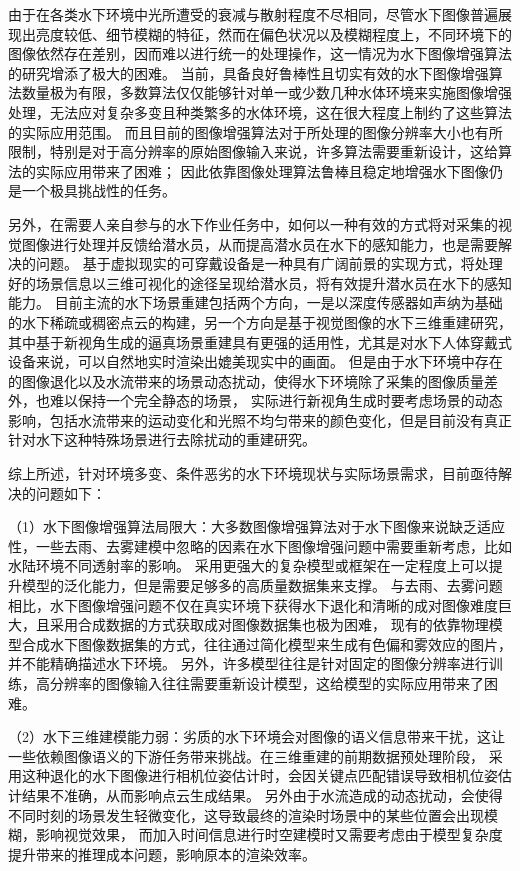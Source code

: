 由于在各类水下环境中光所遭受的衰减与散射程度不尽相同，尽管水下图像普遍展现出亮度较低、细节模糊的特征，然而在偏色状况以及模糊程度上，不同环境下的图像依然存在差别，因而难以进行统一的处理操作，这一情况为水下图像增强算法的研究增添了极大的困难。
当前，具备良好鲁棒性且切实有效的水下图像增强算法数量极为有限，多数算法仅仅能够针对单一或少数几种水体环境来实施图像增强处理，无法应对复杂多变且种类繁多的水体环境，这在很大程度上制约了这些算法的实际应用范围。
而且目前的图像增强算法对于所处理的图像分辨率大小也有所限制，特别是对于高分辨率的原始图像输入来说，许多算法需要重新设计，这给算法的实际应用带来了困难；
因此依靠图像处理算法鲁棒且稳定地增强水下图像仍是一个极具挑战性的任务。

另外，在需要人亲自参与的水下作业任务中，如何以一种有效的方式将对采集的视觉图像进行处理并反馈给潜水员，从而提高潜水员在水下的感知能力，也是需要解决的问题。\cite{underwater_perception}
基于虚拟现实的可穿戴设备是一种具有广阔前景的实现方式，将处理好的场景信息以三维可视化的途径呈现给潜水员，将有效提升潜水员在水下的感知能力。
目前主流的水下场景重建包括两个方向，一是以深度传感器如声纳为基础的水下稀疏或稠密点云的构建，另一个方向是基于视觉图像的水下三维重建研究，
其中基于新视角生成的逼真场景重建具有更强的适用性，尤其是对水下人体穿戴式设备来说，可以自然地实时渲染出媲美现实中的画面。
但是由于水下环境中存在的图像退化以及水流带来的场景动态扰动，使得水下环境除了采集的图像质量差外，也难以保持一个完全静态的场景，
实际进行新视角生成时要考虑场景的动态影响，包括水流带来的运动变化和光照不均匀带来的颜色变化，但是目前没有真正针对水下这种特殊场景进行去除扰动的重建研究。

综上所述，针对环境多变、条件恶劣的水下环境现状与实际场景需求，目前亟待解决的问题如下：

（1）水下图像增强算法局限大：大多数图像增强算法对于水下图像来说缺乏适应性，一些去雨、去雾建模中忽略的因素在水下图像增强问题中需要重新考虑，比如水陆环境不同透射率的影响。
采用更强大的复杂模型或框架在一定程度上可以提升模型的泛化能力，但是需要足够多的高质量数据集来支撑。
与去雨、去雾问题相比，水下图像增强问题不仅在真实环境下获得水下退化和清晰的成对图像难度巨大，且采用合成数据的方式获取成对图像数据集也极为困难，
现有的依靠物理模型合成水下图像数据集的方式，往往通过简化模型来生成有色偏和雾效应的图片，并不能精确描述水下环境。
另外，许多模型往往是针对固定的图像分辨率进行训练，高分辨率的图像输入往往需要重新设计模型，这给模型的实际应用带来了困难。

（2）水下三维建模能力弱：劣质的水下环境会对图像的语义信息带来干扰，这让一些依赖图像语义的下游任务带来挑战。在三维重建的前期数据预处理阶段，
采用这种退化的水下图像进行相机位姿估计时，会因关键点匹配错误导致相机位姿估计结果不准确，从而影响点云生成结果。
另外由于水流造成的动态扰动，会使得不同时刻的场景发生轻微变化，这导致最终的渲染时场景中的某些位置会出现模糊，影响视觉效果，
而加入时间信息进行时空建模时又需要考虑由于模型复杂度提升带来的推理成本问题，影响原本的渲染效率。

